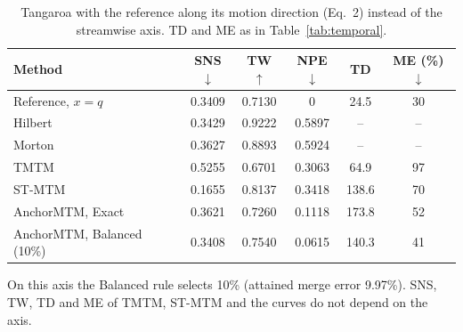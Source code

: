\begin{table}[!h]
\centering
\caption{Tangaroa with the reference along its motion direction (Eq.~2) instead of the streamwise axis. TD and ME as in Table~\ref{tab:temporal}.}
\label{tab:tangaroa-motion}
\footnotesize
\setlength{\tabcolsep}{3pt}
\begin{tabular}{@{}lccccc@{}}
\toprule
Method & SNS$\downarrow$ & TW$\uparrow$ & NPE$\downarrow$ & TD & ME (\%)$\downarrow$ \\
\midrule
Reference, $x=q$ & 0.3409 & 0.7130 & 0 & 24.5 & 30 \\
Hilbert & 0.3429 & 0.9222 & 0.5897 & -- & -- \\
Morton & 0.3627 & 0.8893 & 0.5924 & -- & -- \\
TMTM & 0.5255 & 0.6701 & 0.3063 & 64.9 & 97 \\
ST-MTM & 0.1655 & 0.8137 & 0.3418 & 138.6 & 70 \\
AnchorMTM, Exact & 0.3621 & 0.7260 & 0.1118 & 173.8 & 52 \\
AnchorMTM, Balanced (10\%) & 0.3408 & 0.7540 & 0.0615 & 140.3 & 41 \\
\bottomrule
\end{tabular}
\vspace{2pt}
\begin{minipage}{0.94\columnwidth}\footnotesize On this axis the Balanced rule selects 10\% (attained merge error 9.97\%). SNS, TW, TD and ME of TMTM, ST-MTM and the curves do not depend on the axis.\end{minipage}
\end{table}
